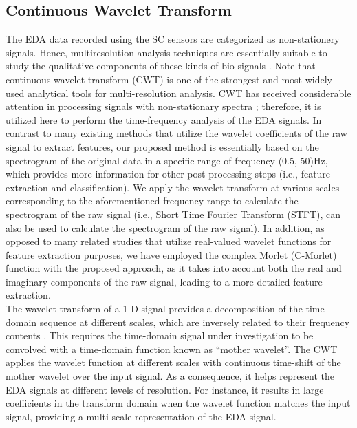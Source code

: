 \subsection{Continuous Wavelet Transform}
The EDA data recorded using the SC sensors are categorized as non-stationery signals\cite{AmbulatorySys2003, EmotionalState2013}. Hence, multiresolution analysis 
techniques are essentially suitable to study the qualitative components of these 
kinds of bio-signals \cite{AmbulatorySys2003}. Note that continuous wavelet transform 
(CWT) is one of the strongest and most widely used analytical tools for multi-resolution 
analysis. CWT has received considerable attention in processing signals with 
non-stationary spectra \cite{WaveletFilter1992, SignalDecomp1989}; therefore, it is 
utilized here to perform the time-frequency analysis of the EDA signals. In contrast 
to many existing methods that utilize the wavelet coefficients of the raw signal to 
extract features, our proposed method is essentially based on the spectrogram of the 
original data in a specific range of frequency (0.5, 50)Hz, which provides more 
information for other post-processing steps (i.e., feature extraction and classification).
We apply the wavelet transform at various scales corresponding to the 
aforementioned frequency range to calculate the spectrogram of the raw signal 
(i.e., Short Time Fourier Transform (STFT), can also be used to calculate the 
spectrogram of the raw signal). In addition, as opposed to many related studies 
that utilize real-valued wavelet functions for feature extraction purposes, we have 
employed the complex Morlet (C-Morlet) function with the proposed approach, as it  
takes into account both the real and imaginary components of the raw signal, leading 
to a more detailed feature extraction.\\

The wavelet transform of a 1-D signal provides a decomposition of the time-domain 
sequence at different scales, which are inversely related to their frequency contents\cite{SignalDecomp1989, ContinuWavelet2009} . 
This requires the time-domain signal under 
investigation to be convolved with a time-domain function known as “mother wavelet”. 
The CWT applies the wavelet function at different scales with continuous time-shift 
of the mother wavelet over the input signal. As a consequence, it helps represent 
the EDA signals at different levels of resolution. For instance, it results in large 
coefficients in the transform domain when the wavelet function matches the input 
signal, providing a multi-scale representation of the EDA signal.\\

